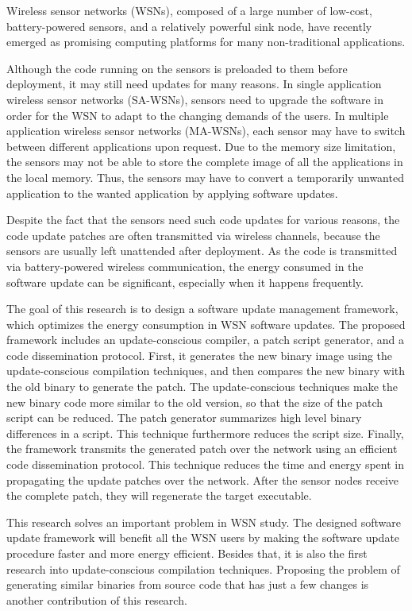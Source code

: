 Wireless sensor networks (WSNs), composed of a large number of low-cost, battery-powered sensors, and a relatively powerful sink node, have recently emerged as promising computing platforms for many non-traditional applications. 

Although the code running on the sensors is preloaded to them before deployment, it may still need updates for many reasons. 
In single application wireless sensor networks (SA-WSNs), sensors need to upgrade the software in order for the WSN to adapt to the changing demands of the users.
In multiple application wireless sensor networks (MA-WSNs), each sensor may have to switch between different applications upon request. Due to the memory size limitation, the sensors may not be able to store the complete image of all the applications in the local memory. 
Thus, the sensors may have to convert a temporarily unwanted application to the wanted application by applying software updates.

Despite the fact that the sensors need such code updates for various reasons, the code update patches are often transmitted via wireless channels, because the sensors are usually left unattended after deployment. As the code is transmitted via battery-powered wireless communication, the energy consumed in the software update can be significant, especially when it happens frequently.

The goal of this research is to design a software update management framework, which
optimizes the energy consumption in WSN software updates. The proposed framework
includes an update-conscious compiler, a patch script generator, and a code dissemination
protocol. First, it generates the new binary image using the update-conscious compilation
techniques, and then compares the new binary with the old binary to generate the patch.
The update-conscious techniques make the new binary code more similar to the old version,
so that the size of the patch script can be reduced. The patch generator summarizes high
level binary differences in a script. This technique furthermore reduces the script size.
Finally, the framework transmits the generated patch over the network using an efficient code
dissemination protocol. This technique reduces the time and energy spent in propagating
the update patches over the network. After the sensor nodes receive the complete patch,
they will regenerate the target executable.

This research solves an important problem in WSN study. The designed software update framework will benefit all the WSN users by making the software update procedure faster and more energy efficient. Besides that, it is also the first research into update-conscious compilation techniques. Proposing the problem of generating similar binaries from source code that has just a few changes is another contribution of this research. 

